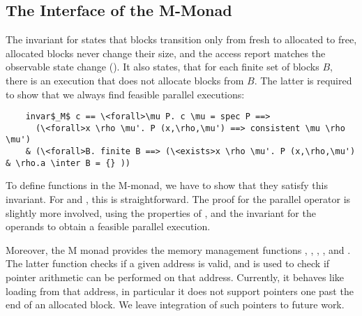 \documentclass[sn-mathphys,Numbered]{sn-jnl}
\theoremstyle{thmstyleone}%
\theoremstyle{definition}%
\theoremstyle{thmstylethree}%
\begin{document}
  \subsection{The Interface of the M-Monad}
  The invariant for  states that blocks transition only from fresh to allocated to free,
  allocated blocks never change their size, and the access report matches the observable state change ().
  It also states, that for each finite set of blocks $B$, there is an execution that does not allocate blocks from $B$.
  The latter is required to show that we always find feasible parallel executions:
  \begin{lstlisting}
    invar$_M$ c == \<forall>\mu P. c \mu = spec P ==>
      (\<forall>x \rho \mu'. P (x,\rho,\mu') ==> consistent \mu \rho \mu')
    & (\<forall>B. finite B ==> (\<exists>x \rho \mu'. P (x,\rho,\mu') & \rho.a \inter B = {} ))
  \end{lstlisting}

  To define functions in the M-monad, we have to show that they satisfy this invariant.
  For  and , this is straightforward. The proof for the parallel operator is slightly more involved,
  using the properties of , and the invariant for the operands to obtain a feasible parallel execution.

  Moreover, the M monad provides the memory management functions , , , , and .
  The latter function checks if a given address is valid, and is used to check if pointer arithmetic can be performed
  on that address. Currently, it behaves like loading from that address, in particular it does not support pointers
  one past the end of an allocated block. We leave integration of such pointers to future work.
\end{document}
